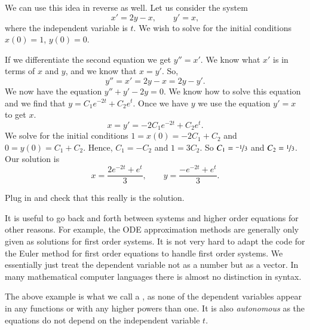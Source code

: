 \documentclass[12pt]{book}
\begin{document}
\begin{example}
We can use this idea in reverse as well.  Let us consider 
the system
\begin{equation*}
x' = 2y-x , \qquad
y' = x, 
\end{equation*}
where the independent variable is $t$.  We wish to solve for the initial
conditions $x(0) = 1$, $y(0) =0$.

If we differentiate the second equation we get
$y''=x'$.  We know what $x'$ is in terms of $x$ and $y$, and
we know that $x=y'$.  So,
\begin{equation*}
y'' = x' = 2y-x = 2y-y' .
\end{equation*}
We now have the equation $y''+y'-2y = 0$.  We know how to solve this
equation and we find that $y = C_1 e^{-2t} + C_2 e^t$.  Once we have $y$
we use the equation $y' = x$ to get $x$.
\begin{equation*}
x = y' = -2 C_1 e^{-2t} + C_2 e^t .
\end{equation*}
We solve for the initial conditions $1 = x(0) = -2 C_1 + C_2$
and $0 = y(0) = C_1 + C_2$.  Hence, $C_1 = -C_2$ and $1 = 3C_2$.
So $C_1 = \nicefrac{-1}{3}$ and $C_2 = \nicefrac{1}{3}$.  Our solution is
\begin{equation*}
x = \frac{2e^{-2t} + e^t}{3} ,\qquad
y = \frac{-e^{-2t} + e^t}{3} .
\end{equation*}
\end{example}

\begin{exercise}
Plug in and check that this really is the solution.
\end{exercise}

It is useful to go back and forth between systems and higher order equations
for other reasons.  For example, the ODE approximation methods are generally
only given as solutions for first order systems.  It is not very hard
to adapt the code for the Euler method for first order equations to handle first
order systems.  We essentially just treat the dependent variable not as
a number but as a vector.  In many mathematical computer languages there is
almost no distinction in syntax.


\medskip

The above example is what we call a \emph{},
as none of the dependent variables appear in any functions or with any higher
powers than one.  It is also \emph{autonomous}
as the equations do not depend
on the independent variable $t$.
\end{document}
